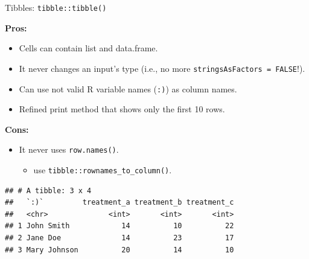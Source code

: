 \documentclass[14pt,ignorenonframetext,]{bredelebeamer}
\newenvironment{Shaded}{\begin{snugshade}}{\end{snugshade}}
\newcommand{\KeywordTok}[1]{\textcolor[rgb]{0.94,0.87,0.69}{#1}}
\newcommand{\DataTypeTok}[1]{\textcolor[rgb]{0.87,0.87,0.75}{#1}}
\newcommand{\StringTok}[1]{\textcolor[rgb]{0.80,0.58,0.58}{#1}}
\newcommand{\OperatorTok}[1]{\textcolor[rgb]{0.94,0.94,0.82}{#1}}
\newcommand{\NormalTok}[1]{\textcolor[rgb]{0.80,0.80,0.80}{#1}}
\providecommand{\tightlist}{%
  \setlength{\itemsep}{0pt}\setlength{\parskip}{0pt}}
\begin{document}
\begin{frame}[fragile]{Tibbles: \texttt{tibble::tibble()}}

\textbf{Pros: }

\begin{itemize}
\tightlist
\item
  Cells can contain list and data.frame.
\item
  It never changes an input's type (i.e., no more
  \texttt{stringsAsFactors\ =\ FALSE}!).
\item
  Can use not valid R variable names (\texttt{:)}) as column names.
\item
  Refined print method that shows only the first 10 rows.
\end{itemize}

\textbf{Cons: }

\begin{itemize}
\tightlist
\item
  It never uses \texttt{row.names()}.

  \begin{itemize}
  \tightlist
  \item
    use \texttt{tibble::rownames\_to\_column()}.
  \end{itemize}
\end{itemize}

\begin{Shaded}
\end{Shaded}

\begin{verbatim}
## # A tibble: 3 x 4
##   `:)`         treatment_a treatment_b treatment_c
##   <chr>              <int>       <int>       <int>
## 1 John Smith            14          10          22
## 2 Jane Doe              14          23          17
## 3 Mary Johnson          20          14          10
\end{verbatim}

\end{frame}
\end{document}

